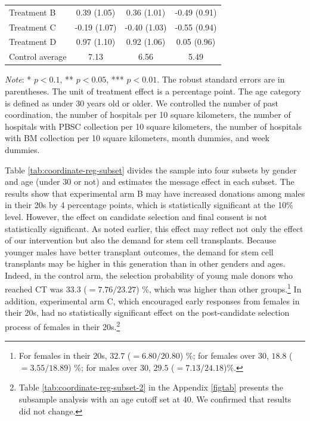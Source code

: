 \documentclass[12pt, a4paper]{article}
\begin{document}
\begin{table}
\begin{threeparttable}
\begin{tabular}[t]{lccc}
\hspace{1em}Treatment B & 0.39 (1.05) & 0.36 (1.01) & -0.49 (0.91)\\
\hspace{1em}Treatment C & -0.19 (1.07) & -0.40 (1.03) & -0.55 (0.94)\\
\hspace{1em}Treatment D & 0.97 (1.10) & 0.92 (1.06) & 0.05 (0.96)\\
\hspace{1em}Control average & 7.13 & 6.56 & 5.49\\
\bottomrule
\end{tabular}
\begin{tablenotes}
\item \emph{Note}: * $p < 0.1$, ** $p < 0.05$, *** $p < 0.01$. The robust standard errors are in parentheses. The unit of treatment effect is a percentage point. The age category is defined as under 30 years old or older. We controlled the number of past coordination, the number of hospitals per 10 square kilometers, the number of hospitals with PBSC collection per 10 square kilometers, the number of hospitals with BM collection per 10 square kilometers, month dummies, and week dummies.
\end{tablenotes}
\end{threeparttable}
\end{table}

Table \ref{tab:coordinate-reg-subset} divides the sample into four subsets by gender and age (under 30 or not) and estimates the message effect in each subset. The results show that experimental arm B may have increased donations among males in their 20s by 4 percentage points, which is statistically significant at the 10\% level. However, the effect on candidate selection and final consent is not statistically significant. As noted earlier, this effect may reflect not only the effect of our intervention but also the demand for stem cell transplants. Because younger males have better transplant outcomes, the demand for stem cell transplants may be higher in this generation than in other genders and ages. Indeed, in the control arm, the selection probability of young male donors who reached CT was \(33.3\) (\(=7.76/23.27\)) \%, which was higher than other groups.\footnote{For females in their 20s, \(32.7\) (\(=6.80 / 20.80\)) \%; for females over 30, \(18.8\) (\(=3.55 / 18.89\)) \%; for males over 30, \(29.5\) (\(=7.13/24.18\))\%.} In addition, experimental arm C, which encouraged early responses from females in their 20s, had no statistically significant effect on the post-candidate selection process of females in their 20s.\footnote{Table \ref{tab:coordinate-reg-subset-2} in the Appendix \ref{figtab} presents the subsample analysis with an age cutoff set at 40. We confirmed that results did not change.}
\end{document}
